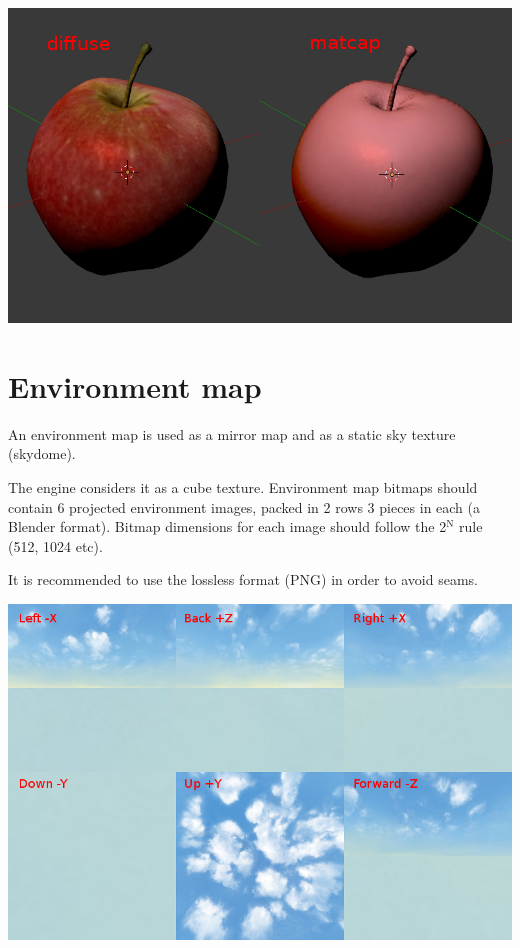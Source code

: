 \documentclass[a4paper,12pt,oneside]{sphinxmanual}
\begin{document}
\begin{DUlineblock}{0em}
\item[] 
\end{DUlineblock}

{\hfill\includegraphics[width=1.000\linewidth]{stencil_apple_separate_textures.jpg}\hfill}

\begin{DUlineblock}{0em}
\item[] 
\end{DUlineblock}


\section{Environment map}
\label{textures:environment-map}\label{textures:index-10}
An environment map is used as a mirror map and as a static sky texture (skydome).

The engine considers it as a cube texture. Environment map bitmaps should contain 6 projected environment images, packed in 2 rows 3 pieces in each (a Blender format). Bitmap dimensions for each image should follow the 2$^{\text{N}}$ rule (512, 1024 etc).

It is recommended to use the lossless format (PNG) in order to avoid seams.

{\hfill\includegraphics[width=1.000\linewidth]{environment_map.png}\hfill}
\end{document}
